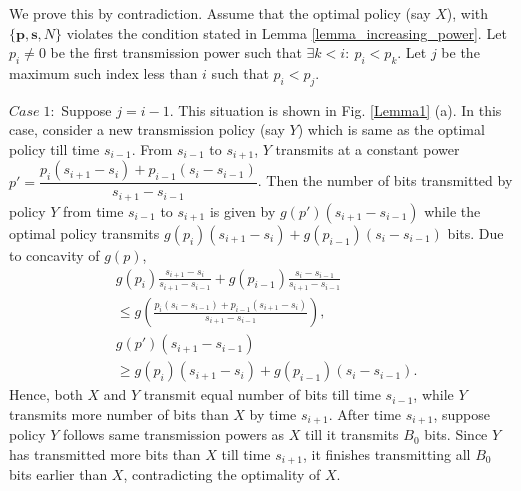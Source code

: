 
We prove this by contradiction. Assume that the optimal policy (say $X$), with $\{\bm{p},\bm{s},N\}$ violates the condition stated in Lemma \ref{lemma_increasing_power}. Let $p_i\neq 0$ be the first transmission power such that $\exists k<i:\ p_i<p_k $. Let $j$ be the maximum such index less than $i$ such that $p_i<p_j$. 

%

$Case\;1:$ Suppose $j=i-1$. This situation is shown in Fig. \ref{Lemma1} (a). In this case, consider a new transmission policy (say $Y$) which is same as the optimal policy till time $s_{i-1}$. From $s_{i-1}$ to $s_{i+1}$, $Y$ transmits at a constant power $p'=\dfrac{p_i(s_{i+1}-s_{i})+p_{i-1}(s_{i}-s_{i-1})}{s_{i+1}-s_{i-1}}$. Then the number of bits transmitted by policy $Y$ from time $s_{i-1}$ to $s_{i+1}$ is given by $g(p')(s_{i+1}-s_{i-1})$ while the optimal policy transmits $g(p_i)(s_{i+1}-s_{i})+g(p_{i-1})(s_{i}-s_{i-1})$ bits. Due to concavity of $g(p)$,
\begin{align*}
&g(p_i)\frac{s_{i+1}-s_{i}}{s_{i+1}-s_{i-1}}+g(p_{i-1})\frac{s_{i}-s_{i-1}}{s_{i+1}-s_{i-1}}
\\ 
&\le g\left(\frac{p_i(s_{i}-s_{i-1})+p_{i-1}(s_{i+1}-s_{i})}{s_{i+1}-s_{i-1}}\right),
\\
& g(p')(s_{i+1}-s_{i-1})
\\
&\ge g(p_i)(s_{i+1}-s_{i})+g(p_{i-1})(s_{i}-s_{i-1}).  
\end{align*}
Hence, both $X$ and $Y$ transmit equal number of bits till time $s_{i-1}$, while $Y$ transmits more number of bits than $X$ by time $s_{i+1}$. After time $s_{i+1}$, suppose policy $Y$ follows same transmission powers as $X$ till it transmits $B_0$ bits. Since $Y$ has transmitted more bits than $X$ till time $s_{i+1}$, it finishes transmitting all $B_0$ bits earlier than $X$, contradicting the optimality of $X$.

